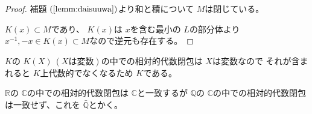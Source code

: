 \documentclass[../master_galois_theory]{subfiles}
\begin{document}
\begin{proof}
  補題 $(\mathrm{\ref{lemm:daisuuwa}})$より和と積について $M$は閉じている。

  $K(x) \subset M$であり、 $K(x)$は $x$を含む最小の $L$の部分体より $x^{-1} , -x \in K(x) \subset M$なので逆元も存在する。
\end{proof}

\begin{exam}
  $K$の $K(X) \  (Xは変数)$の中での相対的代数閉包は $X$は変数なので
  それが含まれると $K$上代数的でなくなるため $K$である。

  $\mathbb{R}$の $\mathbb{C}$の中での相対的代数閉包は $\mathbb{C}$と一致するが
  $\mathbb{Q}$の $\mathbb{C}$の中での相対的代数閉包は一致せず、これを $\bar{\mathbb{Q}}$とかく。
\end{exam}

\clearpage
\end{document}
